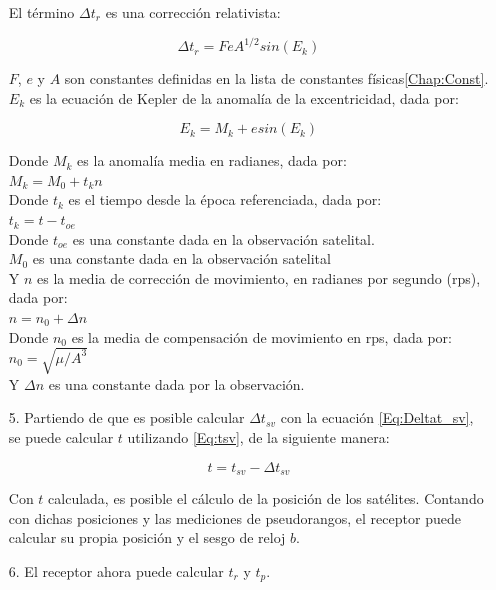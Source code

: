\begin{itemize}
El término $\Delta t_{r}$ es una corrección relativista:

\begin{equation}
\label{Eq:Deltat_r}
\Delta t_r = FeA^{1/2}sin(E_{k})
\end{equation}

$F$, $e$ y $A$ son constantes definidas en la lista de constantes físicas\ref{Chap:Const}.\\

$E_{k}$ es la ecuación de Kepler de la anomalía de la excentricidad, dada por:

\begin{equation}
\label{Eq:Kepler}
E_k = M_k + esin(E_k)
\end{equation}

Donde $M_k$ es la anomalía media en radianes, dada por: \\

$M_k = M_0 + t_k n$\\

Donde $t_k$ es el tiempo desde la época referenciada, dada por:\\

$t_k = t - t_{oe}$\\

Donde $t_{oe}$ es una constante dada en la observación satelital.\\

$M_0$ es una constante dada en la observación satelital\\

Y $n$ es la media de corrección de movimiento, en radianes por segundo (rps), dada por:\\

$n = n_0 + \Delta n$\\

Donde $n_0$ es la media de compensación de movimiento en rps, dada por:\\

$n_0 = \sqrt{\mu / A^{3}}$\\ 

Y $\Delta n$ es una constante dada por la observación.\\

\item[5.] Partiendo de que es posible calcular $\Delta t_{sv}$ con la ecuación \ref{Eq:Deltat_sv}, se puede calcular $t$ utilizando \ref{Eq:tsv}, de la siguiente manera:

\begin{equation}
\label{t}
t = t_{sv} - \Delta t_{sv}
\end{equation}

Con $t$ calculada, es posible el cálculo de la posición de los satélites. Contando con dichas posiciones y las mediciones de pseudorangos, el receptor puede calcular su propia posición y el sesgo de reloj $b$.

\item[6.] El receptor ahora puede calcular $t_r$ y $t_p$\cite{farrell2008aided}.
\end{itemize}

